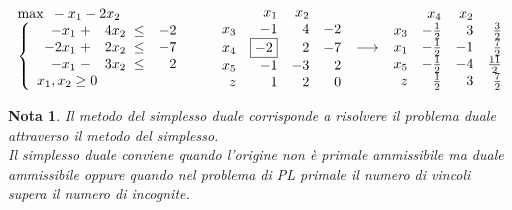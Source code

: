 \documentclass[10pt]{article}
\newtheorem{Not}{Nota}%
\begin{document}
\[
   \begin{array}{l}
        \max \mbox{\ }-x_1 - 2x_2 \\
        \left\{
        \begin{array}{l}
        \begin{array}{rrrr}
             -x_1 \;+&  4x_2 \;\leq &  -2 \\
            -2x_1 \;+&  2x_2 \;\leq &  -7 \\
             -x_1 \;-&  3x_2 \;\leq &   2 \\
        \end{array} \\
        x_1, x_2  \geq 0    
        \end{array}
        \right.
   \end{array}
\hfill
\hspace{0.4cm}
   \begin{array}{rrrrr}
         & x_1  & x_2  \\
      x_3 & -1 &  4  & -2 \\
      x_4 & \fbox{$-2$}  & 2  & -7  \\
      x_5 & -1 &  -3  & 2 \\
       z  & 1 &  2  & 0 \\
   \end{array}
\hfill
\hspace{0.2cm}
{\longrightarrow}
\hfill
\hspace{0.2cm}
   \begin{array}{rrrrr}
         & x_4  & x_2  \\
      x_3 & -\frac{1}{2} &  3  & \frac{3}{2} \\
      x_1 & -\frac{1}{2} & -1  & \frac{7}{2} \\
      x_5 & -\frac{1}{2} & -4  & \frac{11}{2} \\
       z  & \frac{1}{2} & 3  & \frac{7}{2} \\
   \end{array}
\]

\begin{Not}
   Il metodo del simplesso duale corrisponde
   a risolvere il problema duale attraverso
   il metodo del simplesso.\\
   Il simplesso duale conviene quando
   l'origine non \`e primale ammissibile 
   ma duale ammissibile oppure quando nel problema di PL
   primale il numero di vincoli supera il numero di incognite.
\end{Not}

\bigskip
\end{document}
